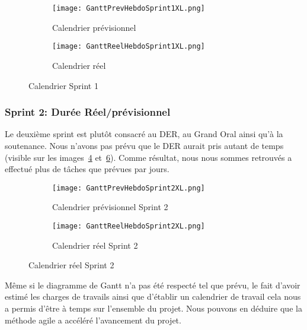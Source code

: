 \begin{figure}
   \centering
   \begin{subfigure}{.5\textwidth}
     \centering
     \texttt{[image: GanttPrevHebdoSprint1XL.png]}
   	\caption[]{Calendrier prévisionnel}
   	\label{fig:gantPrevHebdo1}
   \end{subfigure}%
   \begin{subfigure}{.5\textwidth}
     \centering
     \texttt{[image: GanttReelHebdoSprint1XL.png]}
   	\caption[]{Calendrier réel}
   	\label{fig:GantReelHebdo1}
   \end{subfigure}
   \caption{Calendrier Sprint 1}
\end{figure}


\subsubsection{Sprint 2: Durée Réel/prévisionnel}
Le deuxième sprint est plutôt consacré au DER, au Grand Oral ainsi qu'à la soutenance.
Nous n'avons pas prévu que le DER aurait pris autant de temps (visible sur les images~\ref{fig:gantPrevHebdo2} et~\ref{fig:GantReelHebdo2}).
Comme résultat, nous nous sommes retrouvés a effectué plus de tâches que prévues par jours. 

\begin{figure}
  \centering
  \begin{subfigure}{.5\textwidth}
    \centering
    \texttt{[image: GanttPrevHebdoSprint2XL.png]}
  	\caption[]{Calendrier prévisionnel Sprint 2}
  	\label{fig:gantPrevHebdo2}
  \end{subfigure}%
  \begin{subfigure}{.5\textwidth}
    \centering
    \texttt{[image: GanttReelHebdoSprint2XL.png]}
  	\caption[]{Calendrier réel Sprint 2}
  	\label{fig:GantReelHebdo2}
  \end{subfigure}
\end{figure}

Même si le diagramme de Gantt n'a pas été respecté tel que prévu, le fait d’avoir estimé les charges de travails ainsi que d'établir un calendrier de travail cela nous a permis d'être à temps sur l'ensemble du projet.
Nous pouvons en déduire que la méthode agile a accéléré l'avancement du projet.








